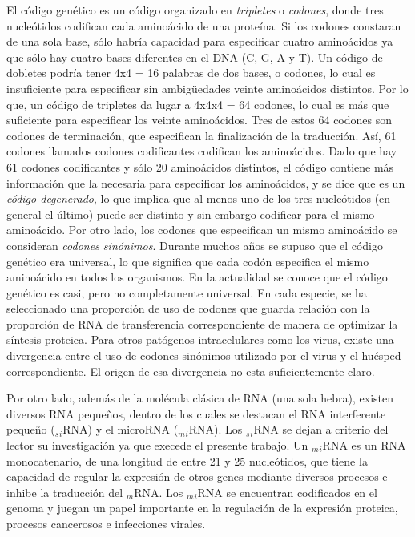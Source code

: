 \par El código genético es un código organizado en \emph{tripletes} o \emph{codones}, donde tres nucleótidos codifican cada aminoácido de una proteína.
Si los codones constaran de una sola base, sólo habría capacidad para especificar cuatro aminoácidos ya que sólo hay cuatro bases diferentes en el DNA (C, G, A y T). Un código de dobletes podría tener 4x4 = 16 palabras de dos bases, o codones, lo cual es insuficiente para especificar sin ambigüedades veinte aminoácidos distintos. Por lo que, un código de tripletes da lugar a 4x4x4 = 64 codones, lo cual es más que suficiente para especificar los veinte aminoácidos\cite{genetica}. Tres de estos 64 codones son codones de terminación, que especifican la finalización de la traducción. Así, 61 codones llamados codones codificantes codifican los aminoácidos. Dado que hay 61 codones codificantes y sólo 20 aminoácidos distintos, el código contiene más información que la necesaria para especificar los aminoácidos, y se dice que es un \emph{código degenerado}, lo que implica que al menos uno de los tres nucleótidos (en general el último) puede ser distinto y sin embargo codificar para el mismo aminoácido\cite{genetica2}. Por otro lado, los codones que especifican un mismo aminoácido se consideran \emph{codones sinónimos}. Durante muchos años se supuso que el código genético era universal, lo que significa que cada codón especifica el mismo aminoácido en todos los organismos. En la actualidad se conoce que el código genético es casi, pero no completamente universal. En cada especie, se ha seleccionado una proporción de uso de codones que guarda relación con la proporción de RNA de transferencia correspondiente de manera de optimizar la síntesis proteica. Para otros patógenos intracelulares como los virus, existe una divergencia entre el uso de codones sinónimos\cite{holme} utilizado por el virus y el huésped correspondiente. El origen de esa divergencia no esta suficientemente claro.

\par Por otro lado, además de la molécula clásica de RNA (una sola hebra), existen diversos RNA pequeños, dentro de los cuales se destacan el RNA interferente pequeño ($_s$$_i$RNA) y el microRNA ($_m$$_i$RNA). Los $_s$$_i$RNA se dejan a criterio del lector su investigación ya que execede el presente trabajo.
Un $_m$$_i$RNA \cite{miRNA}\cite{miRNA2} es un RNA monocatenario, de una longitud de entre 21 y 25 nucleótidos, que tiene la capacidad de regular la expresión de otros genes mediante diversos procesos e inhibe la traducción del $_m$RNA. Los $_m$$_i$RNA se encuentran codificados en el genoma y juegan un papel importante en la regulación de la expresión proteica, procesos cancerosos e infecciones virales. 

